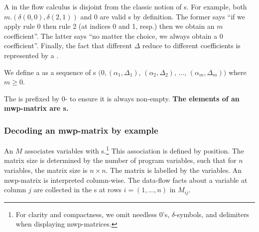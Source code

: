 \noindent
A  in the flow calculus is disjoint from the classic notion of
s. For example, both \(m.(\delta(0,0),\delta(2,1))\)
and \(0\) are valid s by definition. The former says
\enquote{if we apply rule 0 then rule 2 (at indices 0 and 1, resp.) then we
obtain an \(m\) coefficient}. The latter says \enquote{no matter the
choice, we always obtain a \(0\) coefficient}. Finally, the fact
that different \(\Delta\) reduce to different
coefficients is represented by a \emph{}.

\begin{definition}
We define a  as a sequence of s
\(\big(0,(\alpha_1,\Delta_1)\), \((\alpha_2,\Delta_2)\), \(\dots\), \((\alpha_m,
\Delta_m)\big)\) where \(m \geq 0\).
\end{definition}

\noindent The  is prefixed by
\(0\)- to ensure it is always non-empty. \textbf{The
elements of an mwp-matrix are s.}

\subsubsection{Decoding an mwp-matrix by example}
\label{subsec:read-mat}

An  \(M\) associates variables with
s.\footnote{ For clarity and compactness, we omit
needless \(0\)'s, \(\delta\)-symbols, and delimiters
when displaying mwp-matrices.} This association is defined by position. The
matrix size is determined by the number of program variables, such that for
\(n\) variables, the matrix size is \(n \times n\). The matrix is labelled by
the variables. An mwp-matrix is interpreted {column-wise}. The data-flow facts
about a variable at column \(j\) are collected in the s at rows \(i=(1, \ldots, n)\) in \(M_{ij}\).

